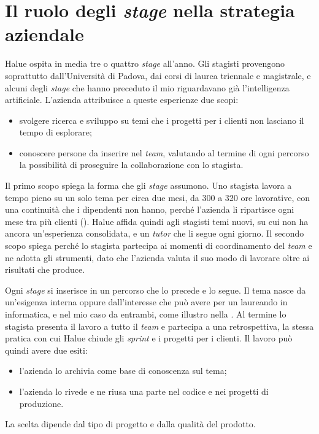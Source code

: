 
\section{Il ruolo degli \emph{stage} nella strategia aziendale}
\label{sec:stage-strategia}

Halue ospita in media tre o quattro \emph{stage} all’anno. Gli stagisti provengono soprattutto
dall’Università di Padova, dai corsi di laurea triennale e magistrale, e alcuni degli \emph{stage}
che hanno preceduto il mio riguardavano già l’intelligenza artificiale. L’azienda attribuisce a
queste esperienze due scopi:

\begin{itemize}
	\item svolgere ricerca e sviluppo su temi che i progetti per i clienti non lasciano il tempo di
	esplorare;
	\item conoscere persone da inserire nel \emph{team}, valutando al termine di ogni percorso la
	possibilità di proseguire la collaborazione con lo stagista.
\end{itemize}

Il primo scopo spiega la forma che gli \emph{stage} assumono. Uno stagista lavora a tempo pieno su
un solo tema per circa due mesi, da 300 a 320 ore lavorative, con una continuità che i dipendenti
non hanno, perché l’azienda li ripartisce ogni mese tra più clienti
(). Halue affida quindi agli stagisti temi nuovi, su cui non ha
ancora un’esperienza consolidata, e un \emph{tutor} che li segue ogni giorno. Il secondo scopo
spiega perché lo stagista partecipa ai momenti di coordinamento del \emph{team} e ne adotta gli
strumenti, dato che l’azienda valuta il suo modo di lavorare oltre ai risultati che produce.

Ogni \emph{stage} si inserisce in un percorso che lo precede e lo segue. Il tema nasce da
un’esigenza interna oppure dall’interesse che può avere per un laureando in informatica, e nel mio
caso da entrambi, come illustro nella . Al termine lo stagista presenta il
lavoro a tutto il \emph{team} e partecipa a una retrospettiva, la stessa pratica con cui Halue
chiude gli \emph{sprint} e i progetti per i clienti. Il lavoro può quindi avere due esiti:

\begin{itemize}
	\item l’azienda lo archivia come base di conoscenza sul tema;
	\item l’azienda lo rivede e ne riusa una parte nel codice e nei progetti di produzione.
\end{itemize}

La scelta dipende dal tipo di progetto e dalla qualità del prodotto.
